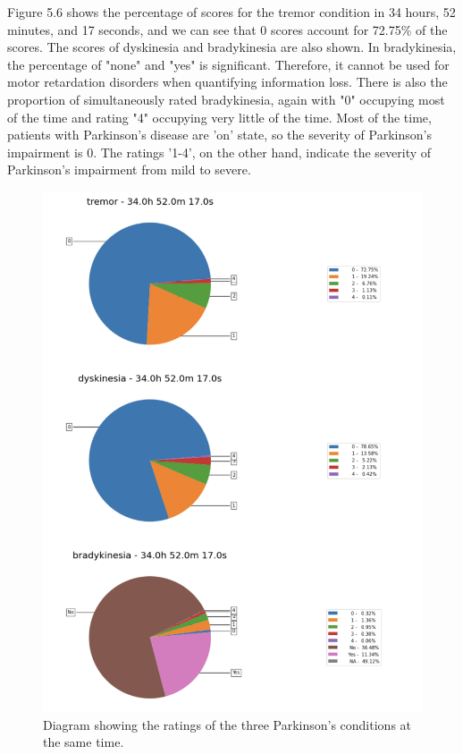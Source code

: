 Figure 5.6 shows the percentage of scores for the tremor condition in 34 hours, 52 minutes, and 17 seconds, and we can see that 0 scores account for 72.75\% of the scores. The scores of dyskinesia and bradykinesia are also shown. In bradykinesia, the percentage of "none" and "yes" is significant. Therefore, it cannot be used for motor retardation disorders when quantifying information loss. There is also the proportion of simultaneously rated bradykinesia, again with "0" occupying most of the time and rating "4" occupying very little of the time. Most of the time, patients with Parkinson's disease are 'on' state, so the severity of Parkinson's impairment is 0. The ratings '1-4', on the other hand, indicate the severity of Parkinson's impairment from mild to severe.

\begin{figure}[htbp]
    \centering
    \includegraphics[width=12cm]{report/pics/PD.png}
    \caption{Diagram showing the ratings of the three Parkinson's conditions at the same time. \cite{MJFF}}
    \label{fig:my_label}
\end{figure}\\

